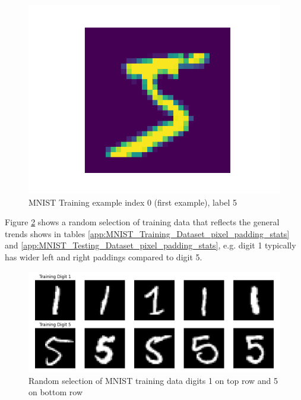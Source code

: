 \begin{figure}[ht]
    \centering
    \includegraphics[width=0.50\columnwidth]{Figures/Results/HandwrittenCharacters/MNIST_training_index_0_label_5.png}
    \caption{MNIST Training example index 0 (first example), label 5}
\label{fig:MNIST_training_index_0_label_5}
\end{figure}

Figure \ref{fig:Training_Digits_1_5} shows a random selection of training data that reflects the general trends shows in tables \ref{app:MNIST_Training_Dataset_pixel_padding_stats} and \ref{app:MNIST_Testing_Dataset_pixel_padding_stats}, e.g. digit 1 typically has wider left and right paddings compared to digit 5.



\begin{figure}[ht]
    \centering
    \includegraphics[width=0.99\columnwidth]{Figures/Results/HandwrittenCharacters/Training_Digits_1_5.png}
    \caption{Random selection of MNIST training data digits 1 on top row and 5 on bottom row}
\label{fig:Training_Digits_1_5}
\end{figure}

